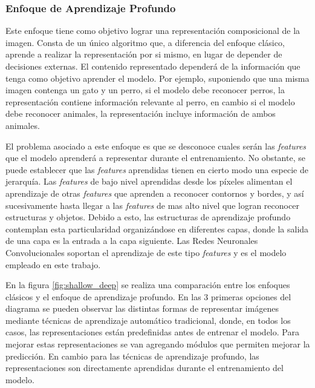 \documentclass[a4paper,11pt,spanish]{book}
\begin{document}
      \subsubsection{Enfoque de Aprendizaje Profundo}
	Este enfoque tiene como objetivo lograr una representación composicional de la imagen. 
	Consta de un único algoritmo que, a diferencia del enfoque clásico, aprende a realizar la representación por si mismo, en lugar de depender de decisiones externas.
	El contenido representado dependerá de la información que tenga como objetivo aprender el modelo. 
	Por ejemplo, suponiendo que una misma imagen contenga un gato y un perro, si el modelo debe reconocer perros, la representación contiene información 
	relevante al perro, en cambio si el modelo debe reconocer animales, la representación incluye información de ambos animales.

	El problema asociado a este enfoque es que se desconoce cuales serán las \emph{features} que el modelo aprenderá a representar durante el entrenamiento.
	No obstante, se puede establecer que las \emph{features} aprendidas tienen en cierto modo una especie de jerarquía. 
	Las \emph{features} de bajo nivel aprendidas desde los píxeles alimentan el aprendizaje de otras \emph{features} que aprenden a reconocer contornos y bordes, 
	y así sucesivamente hasta llegar a las \emph{features} de mas alto nivel que logran reconocer estructuras y objetos. 
	Debido a esto, las estructuras de aprendizaje profundo contemplan esta particularidad organizándose en diferentes capas, donde la salida de una capa es la entrada 
	a la capa siguiente. Las Redes Neuronales Convolucionales soportan el aprendizaje de este tipo \emph{features} y es el modelo empleado en este trabajo. 

	En la figura \ref{fig:shallow_deep} se realiza una comparación entre los enfoques clásicos y el enfoque de aprendizaje profundo.  
	En las 3 primeras opciones del diagrama se pueden observar las distintas formas de representar imágenes mediante técnicas de aprendizaje automático tradicional,
	donde, en todos los casos, las representaciones están predefinidas antes de entrenar el modelo. 
	Para mejorar estas representaciones se van agregando módulos que permiten mejorar la predicción.
	En cambio para las técnicas de aprendizaje profundo, las representaciones son directamente aprendidas durante el entrenamiento del modelo.
\end{document}
